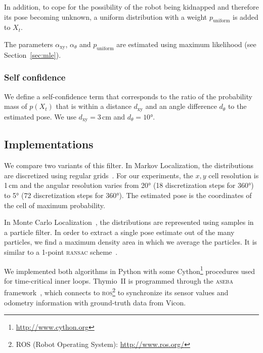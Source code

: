 \documentclass[letterpaper, 10pt, conference]{ieeeconf}
\newcommand{\sect}[1]{Section~\ref{sec:#1}}
\begin{document}
In addition, to cope for the possibility of the robot being kidnapped and therefore its pose becoming unknown, a uniform distribution with a weight $p_\mathrm{uniform}$ is added to $X_t$.

The parameters $\alpha_\mathrm{xy}$, $\alpha_\theta$ and $p_\mathrm{uniform}$ are estimated using maximum likelihood (see \sect{mle}).

\subsubsection{Self confidence}

We define a self-confidence term that corresponds to the ratio of the probability mass of $p(X_t)$ that is within a distance $d_\mathrm{xy}$ and an angle difference $d_\theta$ to the estimated pose.
We use $d_\mathrm{xy} = 3$\,cm and $d_\theta = 10$°.

\subsection{Implementations}

We compare two variants of this filter.
In Markov Localization, the distributions are discretized using regular grids~\cite{fox1999markov}.
For our experiments, the $x,y$ cell resolution is 1\,cm and the angular resolution varies from 20° (18 discretization steps for 360°) to 5° (72 discretization steps for 360°).
The estimated pose is the coordinates of the cell of maximum probability.

In Monte Carlo Localization~\cite{dellaert1999monte}, the distributions are represented using samples in a particle filter.
In order to extract a single pose estimate out of the many particles, we find a maximum density area in which we average the particles.
It is similar to a 1-point \textsc{ransac} scheme~\cite{Fischler1981ransac}.

We implemented both algorithms in Python with some Cython\footnote{\url{http://www.cython.org}} procedures used for time-critical inner loops.
Thymio~II is programmed through the \textsc{aseba} framework~\cite{aseba2011tmech}, which connects to \textsc{ros}\footnote{ROS (Robot Operating System): \url{http://www.ros.org/}} to synchronize its sensor values and odometry information with ground-truth data from Vicon.
\end{document}
